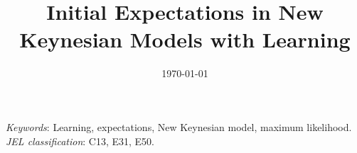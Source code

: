 \documentclass[12pt]{article}
\begin{document}
\begin{titlepage}
\begin{singlespace}
\title{Initial Expectations in New Keynesian Models with Learning}
\date{\today}

\maketitle

\thispagestyle{empty}

\abstract{} \newline  

\noindent \textit{Keywords}: Learning, expectations, New Keynesian model, maximum likelihood. \\
\noindent \textit{JEL classification}: C13, E31, E50.
\end{singlespace}
\end{titlepage}
\newpage


\newpage

\newpage

\end{document}
